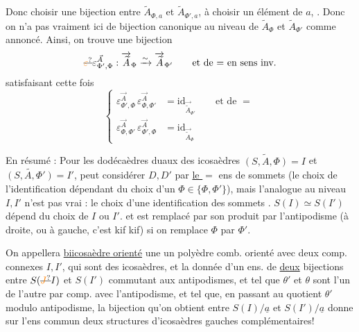 Donc choisir une bijection entre $\widetilde A_{\Phi,a}$ et $\widetilde A_{\Phi',a}$, 
à choisir un élément de $a$, .
Donc on n'a pas
vraiment ici de bijection canonique au niveau
de $\widetilde A_\Phi$ et $\widetilde A_{\Phi'}$ comme annoncé. Ainsi, on
trouve une bijection
\[
\deleted{\unsure{\varepsilon}}\varepsilon^{\vec A}_{\Phi',\Phi}:
\overrightarrow{\widetilde A}_\Phi\xrightarrow{\sim}\overrightarrow{\widetilde A}_{\Phi'}
\qquad\text{et de $=$ en sens inv.}
\]
satisfaisant cette fois
\[
\left\{\begin{aligned}
\varepsilon^{\vec A}_{\Phi',\Phi}\,\varepsilon^{\vec A}_{\Phi,\Phi'}&=\mathrm{id}_{\overrightarrow{\widetilde A}_{\Phi'}}\qquad\text{et de }=\\
\varepsilon^{\vec A}_{\Phi,\Phi'}\,\varepsilon^{\vec A}_{\Phi',\Phi}&=\mathrm{id}_{\overrightarrow{\widetilde A}_\Phi}
\end{aligned}\right.
\]

En résumé : Pour les dodécaèdres  duaux
des icosaèdres $\widetilde{(S,A,\Phi)}=I$ et $\widetilde{(S,A,\Phi')}=I'$, 
peut considérer $D,D'$  par \uline{le $=$} ens
de sommets (le choix de l'identification 
dépendant  du choix d'un $\Phi\in\{\Phi,\Phi'\}$),
mais l'analogue au niveau $I,I'$ n'est
pas vrai : le choix d'une identification des
sommets . $S(I)\simeq S(I')$ dépend du choix de $I$ ou $I'$.
et est remplacé par son produit par l'antipodisme
(à droite, ou à gauche, c'est kif kif) si on remplace
$\Phi$ par $\Phi'$.

On appellera \uline{biicosaèdre orienté} une 
 un polyèdre comb. orienté avec
deux comp. connexes $I,I'$, qui sont
des icosaèdres, et la donnée d'un ens. 
de \uline{deux} bijections  entre $S(\deleted{\unsure{J}}I)$ et $S(I')$
commutant aux antipodismes, et
 tel que $\theta'$ et $\theta$ sont  l'un de
l'autre par comp. avec l'antipodisme,
et tel que, en passant au quotient 
 $\theta'$ modulo antipodisme, la
bijection qu'on obtient entre $S(I)/\underline a$ et $S(I')/\underline a$
donne sur l'ens commun deux structures
d'icosaèdres gauches  complémentaires!

